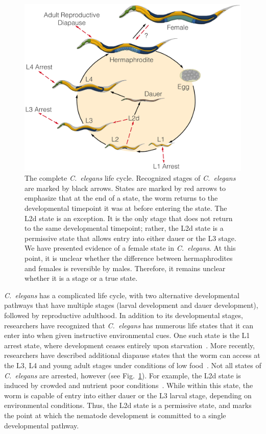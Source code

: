 \documentclass[10pt,letterpaper,twocolumn]{article}
\newcommand{\cel}{\emph{C.~elegans}}
\begin{document}
\begin{figure}
\renewcommand{\familydefault}{\sfdefault}\normalfont{}
\centering
\includegraphics[width=\linewidth]{../output/figs/final_figs/c_elegans_life_cycle.pdf}
\caption{
The complete \cel{} life cycle. Recognized stages of \cel{} are marked by black
arrows. States are marked by red arrows to emphasize that at the end of a state,
the worm returns to the developmental timepoint it was at before entering the
state. The L2d state is an exception. It is the only stage that does not return
to the same developmental timepoint; rather, the L2d state is a permissive state
that allows entry into either dauer or the L3 stage. We have presented evidence
of a female state in \cel{}. At this point, it is unclear whether the difference
between hermaphrodites and females is reversible by males. Therefore, it remains
unclear whether it is a stage or a true state.
}%
\label{fig:lifecycle}
\end{figure}

\cel{} has a complicated life cycle, with two alternative developmental pathways
that have multiple stages (larval development and dauer development), followed
by reproductive adulthood. In addition to its developmental stages, researchers
have recognized that \cel{} has numerous life states that it can enter into when
given instructive environmental cues. One such state is the L1 arrest state,
where development ceases entirely upon starvation~\cite{Johnson1984}. More
recently, researchers have described additional diapause states that the worm
can access at the L3, L4 and young adult stages under conditions of low
food~\cite{Angelo2009,Seidel2011,Schindler2014}. Not all states of \cel{} are
arrested, however (see Fig.~\ref{fig:lifecycle}). For example, the L2d state is
induced by crowded and nutrient poor conditions~\cite{Golden1984}. While within
this state, the worm is capable of entry into either dauer or the L3 larval
stage, depending on environmental conditions. Thus, the L2d state is a
permissive state, and marks the point at which the nematode development is
committed to a single developmental pathway.
\end{document}
